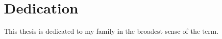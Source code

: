 \section*{Dedication}
\label{sec:dedication}

This thesis is dedicated to my family in the broadest sense of the term.
